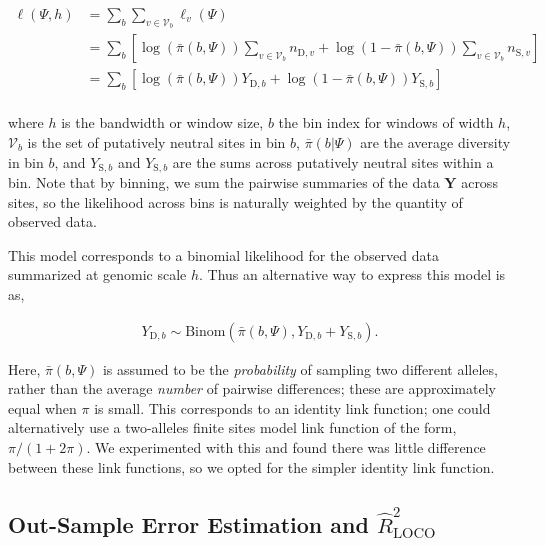 \documentclass[11pt]{article}
\begin{document}
\begin{align}
  \ell(\Psi, h) &= \sum_{b} \sum_{v \in \mathcal{V}_b} \ell_v(\Psi) \\
             &= \sum_{b} \left[\log(\bar{\pi}(b, \Psi)) \sum_{v \in \mathcal{V}_b} n_{\text{D},v} + \log(1-\bar{\pi}(b, \Psi)) \sum_{v \in \mathcal{V}_b} n_{\text{S},{v}}\right] \\
             &= \sum_{b} \left[\log(\bar{\pi}(b, \Psi)) Y_{\text{D},b} + \log(1-\bar{\pi}(b, \Psi)) Y_{\text{S},{b}}\right] \\
\end{align}

where $h$ is the bandwidth or window size, $b$ the bin index for windows of
width $h$, $\mathcal{V}_b$ is the set of putatively neutral sites in bin $b$,
$\bar{\pi}(b | \Psi)$ are the average diversity in bin $b$, and
$Y_{\text{S},b}$ and $Y_{\text{S},b}$ are the sums across putatively neutral
sites within a bin. Note that by binning, we sum the pairwise summaries of the
data $\mathbf{Y}$ across sites, so the likelihood across bins is naturally
weighted by the quantity of observed data. 



This model corresponds to a binomial likelihood for the observed data
summarized at genomic scale $h$. Thus an alternative way to express this model
is as, 

\begin{align}
  Y_{\text{D},b} \sim \text{Binom}(\bar{\pi}(b, \Psi), Y_{\text{D},b} + Y_{\text{S},b}).
\end{align}

Here, $\bar{\pi}(b, \Psi)$ is assumed to be the \emph{probability} of sampling
two different alleles, rather than the average \emph{number} of pairwise
differences; these are approximately equal when $\pi$ is small. This
corresponds to an identity link function; one could alternatively use a
two-alleles finite sites model link function of the form, $\pi/(1 + 2 \pi)$. We
experimented with this and found there was little difference between these link
functions, so we opted for the simpler identity link function.

\subsection{Out-Sample Error Estimation and $\widehat{R}_\text{LOCO}^2$}
\end{document}
